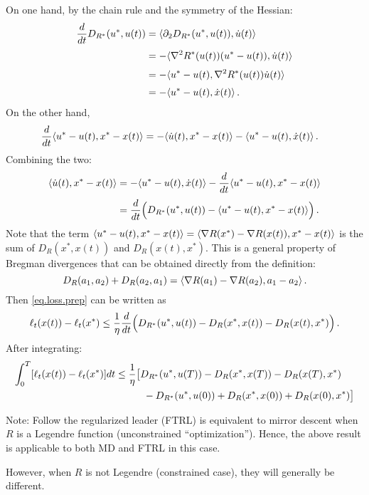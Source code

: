 \documentclass[12pt]{report}
\theoremstyle{plain}
\theoremstyle{definition}
\theoremstyle{remark}
\begin{document}
On one hand, by the chain rule and the symmetry of the Hessian:
\begin{align*}
\frac{d}{dt} D_{R^{*}}(u^{*}, u(t))
&= \langle { \partial_{2} D_{R^{*}}(u^{*}, u(t)), \dot{u}(t)}\rangle \\[1mm]
&= - \langle { \nabla^2 R^{*}(u(t))(u^{*} -u(t)), \dot{u}(t) }\rangle \\[1mm]
&= - \langle { u^{*} -u(t), \nabla^2 R^{*}(u(t)) \dot{u}(t) }\rangle \\[1mm]
&= - \langle {u^{*} - u(t), \dot{x}(t)}\rangle\,.
\end{align*}
On the other hand,
\begin{align*}
\frac{d}{dt} \langle {u^{*} - u(t), x^{*} - x(t)}\rangle
&= - \langle { \dot{u}(t), x^{*} - x(t)}\rangle - \langle { u^{*} -u(t), \dot{x}(t) }\rangle\,.
\end{align*}
Combining the two:
\begin{align*}
\langle { \dot{u}(t), x^{*} - x(t)}\rangle
&= - \langle { u^{*} -u(t), \dot{x}(t) }\rangle - \frac{d}{dt} \langle {u^{*} - u(t), x^{*} - x(t)}\rangle \\[1mm]
&= \frac{d}{dt} \Bigl( D_{R^{*}}(u^{*}, u(t)) - \langle {u^{*} - u(t), x^{*} - x(t)}\rangle \Bigr)\,.
\end{align*}
Note that the term
$\langle {u^{*} - u(t), x^{*} - x(t)}\rangle = \langle {\nabla R(x^{*}) - \nabla R(x(t)), x^{*} - x(t)}\rangle$
is the sum of $D_{R}(x^{*}, x(t))$ and $D_{R}(x(t), x^{*})$.
This is a general property of Bregman divergences that can be obtained directly from the definition:
$$
D_{R}(a_{1}, a_{2}) + D_{R}(a_{2}, a_{1})
= \langle {\nabla R(a_{1}) - \nabla R(a_{2}), a_{1} - a_{2}}\rangle\,.
$$
Then \eqref{eq.loss.prep} can be written as
\begin{equation*}
\ell_{t}(x(t)) - \ell_{t}(x^{*})
\leq  \frac{1}{\eta} \frac{d}{dt} \Bigl( D_{R^{*}}(u^{*}, u(t)) - D_{R}(x^{*}, x(t)) - D_{R}(x(t), x^{*})\Bigr)\,.
\end{equation*}
After integrating:
\begin{align*}
\int_{0}^{T} [\ell_{t}(x(t)) - \ell_{t}(x^{*})] dt
&\leq \frac{1}{\eta} \bigl[ D_{R^{*}}(u^{*}, u(T)) - D_{R}(x^{*}, x(T)) - D_{R}(x(T), x^{*}) \\
&\hspace{10mm}- D_{R^{*}}(u^{*}, u(0)) + D_{R}(x^{*}, x(0)) + D_{R}(x(0), x^{*}) \bigr]
\end{align*}

Note: Follow the regularized leader (FTRL) is equivalent to mirror descent when $R$ is a Legendre function
(unconstrained ``optimization'').
Hence, the above result is applicable to both MD and FTRL in this case.

However, when $R$ is not Legendre (constrained case), they will generally be different.
\end{document}
